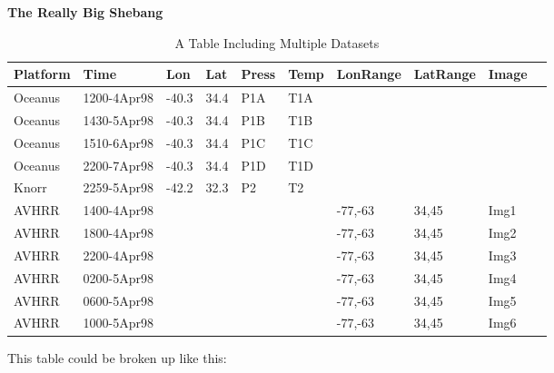 \documentclass[10pt]{report}
\begin{document}
\begin{table}[h]
\begin{center}
\textbf{The Really Big Shebang} \\
\begin{tabular}{|l|l|l|l|l|l|l|l|l|l|} \hline
Platform&Time        &Lon   &Lat &Press &Temp &LonRange&LatRange&Image\\ \hline
Oceanus &1200-4Apr98 &-40.3 &34.4&P1A   &T1A  &        &        &     \\
Oceanus &1430-5Apr98 &-40.3 &34.4&P1B   &T1B  &        &        &     \\
Oceanus &1510-6Apr98 &-40.3 &34.4&P1C   &T1C  &        &        &     \\
Oceanus &2200-7Apr98 &-40.3 &34.4&P1D   &T1D  &        &        &     \\
Knorr   &2259-5Apr98 &-42.2 &32.3&P2    &T2   &        &        &     \\
AVHRR   &1400-4Apr98 &      &    &      &     &-77,-63 &34,45   &Img1 \\
AVHRR   &1800-4Apr98 &      &    &      &     &-77,-63 &34,45   &Img2 \\
AVHRR   &2200-4Apr98 &      &    &      &     &-77,-63 &34,45   &Img3 \\
AVHRR   &0200-5Apr98 &      &    &      &     &-77,-63 &34,45   &Img4 \\
AVHRR   &0600-5Apr98 &      &    &      &     &-77,-63 &34,45   &Img5 \\
AVHRR   &1000-5Apr98 &      &    &      &     &-77,-63 &34,45   &Img6 \\ \hline
\end{tabular}
\end{center}
\caption{A Table Including Multiple Datasets}
\label{fig:reltbl2}
\end{table}

This table could be broken up like this:
\end{document}
